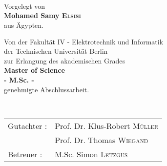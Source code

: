 \begin{titlepage}
\begin{center}
\vspace*{2.0cm}
 \\
\vspace*{0.2cm}
 \\
\vspace*{0.2cm}
 \\

\vspace*{1.5cm}
\noindent \large {Vorgelegt von\\}
\vspace*{0.1cm}
\noindent \large {\bf Mohamed Samy \textsc{Elsisi}} \\
\vspace*{0.1cm}
\noindent \large {aus Ägypten.\\}
\vspace*{1.5cm}

\noindent \large {Von der Fakult\"at IV - Elektrotechnik und Informatik} \\
\vspace*{0.1cm}
\noindent \large {der Technischen Universit\"at Berlin} \\
\vspace*{0.1cm}
\noindent \large {zur Erlangung des akademischen Grades} \\
\vspace*{0.2cm}
\noindent \large {\bf Master of Science} \\
\vspace*{0.1cm}
\noindent \large {\bf - M.Sc. -} \\
\vspace*{0.2cm}
\noindent \large {genehmigte Abschlussarbeit.} \\
\vspace*{1.5cm}

\vspace*{0.1cm}
~\\
\begin{tabular}{ll}
      \vspace*{0.1cm}
      \noindent \large{Gutachter :}	& \noindent \large{Prof. Dr. Klus-Robert \textsc{Müller}}\\
      \vspace*{0.1cm}
					& \noindent \large{Prof. Dr. Thomas \textsc{Wiegand}}\\
	\vspace*{0.1cm}
	\noindent \large{Betreuer :}	& \noindent \large{M.Sc. Simon \textsc{Letzgus}}
\end{tabular}

\vspace*{1.5cm}

\end{center}
\end{titlepage}
\sloppy

\titlepage
